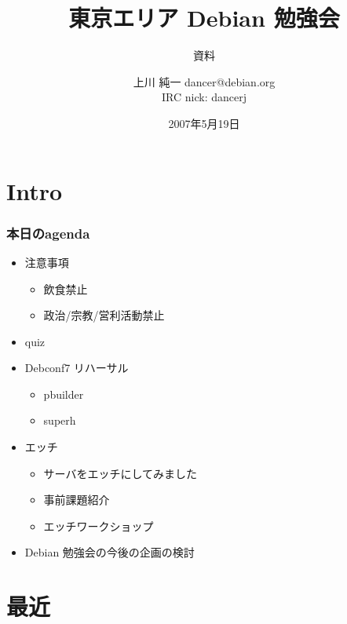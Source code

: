 \documentclass[cjk,dvipdfmx,12pt]{beamer}
\title{東京エリア Debian 勉強会}
\subtitle{資料}
\author{上川 純一 dancer@debian.org\\IRC nick: dancerj}
\date{2007年5月19日}
\begin{document}
\frame{\titlepage{}}

\section{Intro}

\begin{frame}
 \frametitle{本日のagenda}
\begin{minipage}[t]{0.45\hsize}
  \begin{itemize}
  \item 注意事項
	\begin{itemize}
	 \item 飲食禁止
	 \item 政治/宗教/営利活動禁止
	\end{itemize}
  \item quiz
  \item Debconf7 リハーサル
	\begin{itemize}
	 \item pbuilder 
	 \item superh
	\end{itemize}
 \end{itemize}
\end{minipage} 
\begin{minipage}[t]{0.45\hsize}
 \begin{itemize}
  \item エッチ
	\begin{itemize}
	 \item サーバをエッチにしてみました
	 \item 事前課題紹介
	 \item エッチワークショップ
	\end{itemize}  
\item Debian 勉強会の今後の企画の検討
 \end{itemize}
\end{minipage}
\end{frame}

\section{最近}
\end{document}

